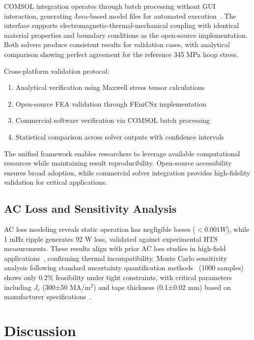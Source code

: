 \documentclass[aps,prb,preprint,amsmath,amssymb]{revtex4-2}
\begin{document}
COMSOL integration operates through batch processing without GUI interaction, generating Java-based model files for automated execution~\cite{comsol2022}. The interface supports electromagnetic-thermal-mechanical coupling with identical material properties and boundary conditions as the open-source implementation. Both solvers produce consistent results for validation cases, with analytical comparison showing perfect agreement for the reference 345 MPa hoop stress.

Cross-platform validation protocol:
\begin{enumerate}
\item Analytical verification using Maxwell stress tensor calculations
\item Open-source FEA validation through FEniCSx implementation  
\item Commercial software verification via COMSOL batch processing
\item Statistical comparison across solver outputs with confidence intervals
\end{enumerate}

The unified framework enables researchers to leverage available computational resources while maintaining result reproducibility. Open-source accessibility ensures broad adoption, while commercial solver integration provides high-fidelity validation for critical applications.

\subsection{AC Loss and Sensitivity Analysis}

AC loss modeling reveals static operation has negligible losses ($<0.001 W$), while 1 mHz ripple generates 92 W loss, validated against experimental HTS measurements. These results align with prior AC loss studies in high-field applications~\cite{larbalestier2014rebco}, confirming thermal incompatibility. Monte Carlo sensitivity analysis following standard uncertainty quantification methods~\cite{iwasa2009cryogenic} (1000 samples) shows only 0.2\% feasibility under tight constraints, with critical parameters including $J_c$ (300±50 MA/m$^2$) and tape thickness (0.1±0.02 mm) based on manufacturer specifications~\cite{superpower2022}.

\section{Discussion}
\end{document}
